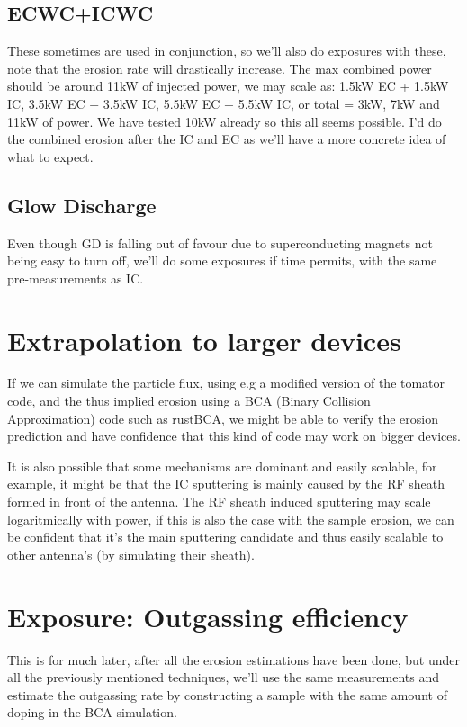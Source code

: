 \documentclass{article}
\begin{document}
\subsection{ECWC+ICWC}
These sometimes are used in conjunction, so we'll also do exposures with these,
note that the erosion rate will drastically increase. The max combined power
should be around 11kW of injected power, we may scale as: 1.5kW EC + 1.5kW IC,
3.5kW EC + 3.5kW IC, 5.5kW EC + 5.5kW IC, or total = 3kW, 7kW and 11kW of
power. We have tested 10kW already so this all seems possible.  I'd do the
combined erosion after the IC and EC as we'll have a more concrete idea of what
to expect.
\subsection{Glow Discharge}
Even though GD is falling out of favour due to superconducting magnets not
being easy to turn off, we'll do some exposures if time permits, with the same
pre-measurements as IC.
\section{Extrapolation to larger devices}
If we can simulate the particle flux, using e.g a modified version of the
tomator code, and the thus implied erosion using a BCA (Binary Collision
Approximation) code such as rustBCA, we might be able to verify the erosion
prediction and have confidence that this kind of code may work on
bigger devices.

It is also possible that some mechanisms are dominant and easily scalable, for
example, it might be that the IC sputtering is mainly caused by the RF sheath
formed in front of the antenna.  The RF sheath induced sputtering may scale
logaritmically with power, if this is also the case with the sample erosion, we
can be confident that it's the main sputtering candidate and thus easily
scalable to other antenna's (by simulating their sheath).

\section{Exposure: Outgassing efficiency}
This is for much later, after all the erosion estimations have been done, but
under all the previously mentioned techniques, we'll use the same measurements
and estimate the outgassing rate by constructing a sample with the same amount
of doping in the BCA simulation.
\end{document}
